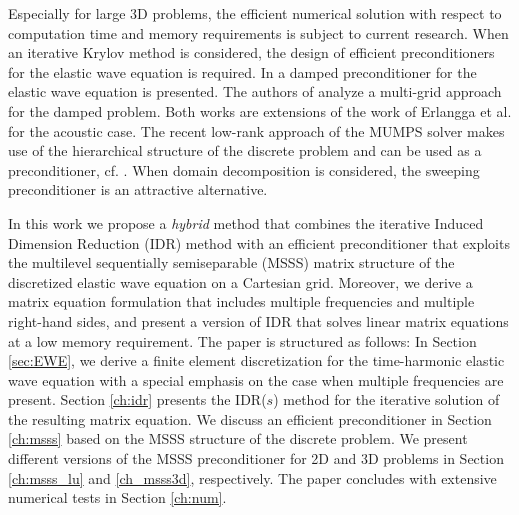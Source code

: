 Especially for large 3D problems, the efficient numerical solution with respect to computation time and memory requirements is subject to current research. When an iterative Krylov method is considered, the design of efficient preconditioners for the elastic wave equation is required. In \cite{apt09} a damped preconditioner for the elastic wave equation is presented. The authors of \cite{Rizzuti2016} analyze a multi-grid approach for the damped problem. Both works are extensions of the work of Erlangga et al. \cite{REPMVO06} for the acoustic case. The recent low-rank approach of the MUMPS solver \cite{Amestoy2015} makes use of the hierarchical structure of the discrete problem and can be used as a preconditioner, cf. \cite{ABBEMMMO16,WHXL12}. When domain decomposition is considered, the sweeping preconditioner \cite{Tsuji2014} is an attractive alternative.

In this work we propose a \textit{hybrid} method that combines the iterative Induced Dimension Reduction (IDR) method with an efficient preconditioner that exploits the multilevel sequentially semiseparable (MSSS) matrix structure of the discretized elastic wave equation on a Cartesian grid. Moreover, we derive a matrix equation formulation that includes multiple frequencies and multiple right-hand sides, and pres\-ent a version of IDR that solves linear matrix equations at a low memory requirement. The paper is structured as follows: In Section \ref{sec:EWE}, we derive a finite element discretization for the time-har\-mon\-ic elastic wave equation with a special emphasis on the case when multiple frequencies are present. Section \ref{ch:idr} pres\-ents the IDR($s$) method for the iterative solution of the resulting matrix equation. We discuss an efficient preconditioner in Section \ref{ch:msss} based on the MSSS structure of the discrete problem. We present different versions of the MSSS preconditioner for 2D and 3D problems in Section \ref{ch:msss_lu} and \ref{ch_msss3d}, respectively. The paper concludes with extensive numerical tests in Section \ref{ch:num}.





